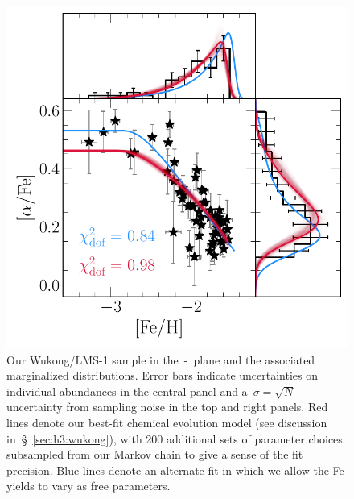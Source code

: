 \begin{figure}
\centering
\includegraphics[scale = 0.65]{wukong_bestfit.pdf}
\caption{
Our Wukong/LMS-1 sample in the~\afe-\feh~plane and the associated marginalized
distributions.
Error bars indicate uncertainties on individual abundances in the central panel
and a~$\sigma = \sqrt{N}$ uncertainty from sampling noise in the top and right
panels.
Red lines denote our best-fit chemical evolution model (see discussion
in~\S~\ref{sec:h3:wukong}), with 200 additional sets of parameter choices
subsampled from our Markov chain to give a sense of the fit precision.
Blue lines denote an alternate fit in which we allow the Fe yields to vary as
free parameters.
}
\label{fig:wukong}
\end{figure}

